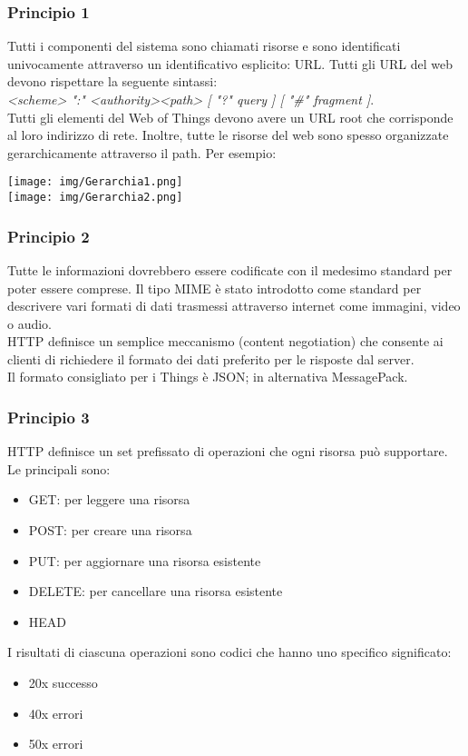 \documentclass{article}
\begin{document}
\subsubsection{Principio 1}
Tutti i componenti del sistema sono chiamati risorse e sono identificati univocamente attraverso un identificativo esplicito: URL. Tutti gli URL del web devono rispettare la seguente sintassi: \\
\textit{<scheme> ":" <authority><path> [ "?" query ] [ "#" fragment ]}. \\ Tutti gli elementi del Web of Things devono avere un URL root che corrisponde al loro indirizzo di rete. Inoltre, tutte le risorse del web sono spesso organizzate gerarchicamente attraverso il path. Per esempio:
\\
\begin{center}
\texttt{[image: img/Gerarchia1.png]}\\
\texttt{[image: img/Gerarchia2.png]}
\end{center}
\subsubsection{Principio 2}
Tutte le informazioni dovrebbero essere codificate con il medesimo standard per poter essere comprese. Il tipo MIME è stato introdotto come standard per descrivere vari formati di dati trasmessi attraverso internet come immagini, video o audio. \\ HTTP definisce un semplice meccanismo (content negotiation) che consente ai clienti di richiedere il formato dei dati preferito per le risposte dal server. \\ Il formato consigliato per i Things è JSON; in alternativa MessagePack.
\subsubsection{Principio 3}
HTTP definisce un set prefissato di operazioni che ogni risorsa può supportare. Le principali sono: 
\begin{itemize}
    \item GET: per leggere una risorsa
    \item POST: per creare una risorsa
    \item PUT: per aggiornare una risorsa esistente
    \item DELETE: per cancellare una risorsa esistente
    \item HEAD
\end{itemize}
I risultati di ciascuna operazioni sono codici che hanno uno specifico significato:
\begin{itemize}
    \item 20x successo
    \item 40x errori 
    \item 50x errori 
\end{itemize} 
\end{document}
